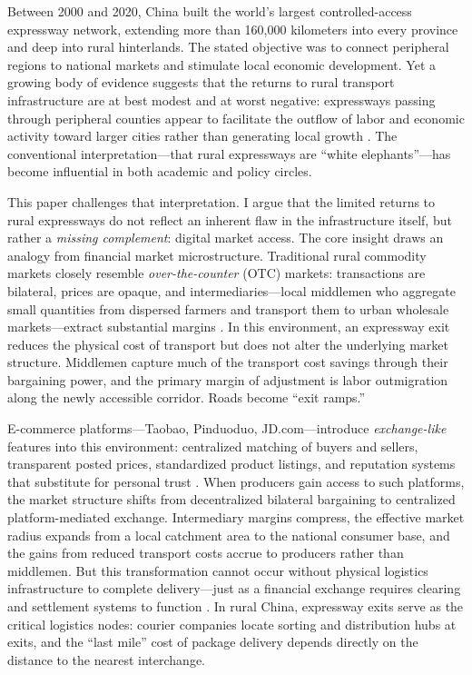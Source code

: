 \documentclass[12pt]{article}
\begin{document}
Between 2000 and 2020, China built the world's largest controlled-access expressway network, extending more than 160,000 kilometers into every province and deep into rural hinterlands. The stated objective was to connect peripheral regions to national markets and stimulate local economic development. Yet a growing body of evidence suggests that the returns to rural transport infrastructure are at best modest and at worst negative: expressways passing through peripheral counties appear to facilitate the outflow of labor and economic activity toward larger cities rather than generating local growth \citep{faber2014,baumsnow2020,banerjee2020}. The conventional interpretation---that rural expressways are ``white elephants''---has become influential in both academic and policy circles.

This paper challenges that interpretation. I argue that the limited returns to rural expressways do not reflect an inherent flaw in the infrastructure itself, but rather a \textit{missing complement}: digital market access. The core insight draws an analogy from financial market microstructure. Traditional rural commodity markets closely resemble \textit{over-the-counter} (OTC) markets: transactions are bilateral, prices are opaque, and intermediaries---local middlemen who aggregate small quantities from dispersed farmers and transport them to urban wholesale markets---extract substantial margins \citep{allen2014,atkin2015}. In this environment, an expressway exit reduces the physical cost of transport but does not alter the underlying market structure. Middlemen capture much of the transport cost savings through their bargaining power, and the primary margin of adjustment is labor outmigration along the newly accessible corridor. Roads become ``exit ramps.''

E-commerce platforms---Taobao, Pinduoduo, JD.com---introduce \textit{exchange-like} features into this environment: centralized matching of buyers and sellers, transparent posted prices, standardized product listings, and reputation systems that substitute for personal trust \citep{couture2021}. When producers gain access to such platforms, the market structure shifts from decentralized bilateral bargaining to centralized platform-mediated exchange. Intermediary margins compress, the effective market radius expands from a local catchment area to the national consumer base, and the gains from reduced transport costs accrue to producers rather than middlemen. But this transformation cannot occur without physical logistics infrastructure to complete delivery---just as a financial exchange requires clearing and settlement systems to function \citep{duffie2011}. In rural China, expressway exits serve as the critical logistics nodes: courier companies locate sorting and distribution hubs at exits, and the ``last mile'' cost of package delivery depends directly on the distance to the nearest interchange.
\end{document}
